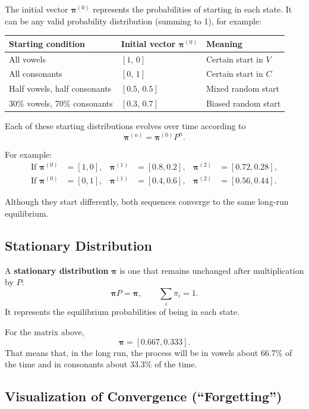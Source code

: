 The initial vector $\boldsymbol{\pi}^{(0)}$ represents the probabilities of starting in each state.  
It can be any valid probability distribution (summing to 1), for example:

\begin{center}
\begin{tabular}{@{}lll@{}}
\toprule
\textbf{Starting condition} & \textbf{Initial vector $\boldsymbol{\pi}^{(0)}$} & \textbf{Meaning} \\ \midrule
All vowels & $[1,\, 0]$ & Certain start in $V$ \\
All consonants & $[0,\, 1]$ & Certain start in $C$ \\
Half vowels, half consonants & $[0.5,\, 0.5]$ & Mixed random start \\
30\% vowels, 70\% consonants & $[0.3,\, 0.7]$ & Biased random start \\
\bottomrule
\end{tabular}
\end{center}

Each of these starting distributions evolves over time according to
\[
\boldsymbol{\pi}^{(n)} = \boldsymbol{\pi}^{(0)} P^n.
\]

For example:
\[
\begin{aligned}
\text{If } \boldsymbol{\pi}^{(0)} &= [1, 0], & \boldsymbol{\pi}^{(1)} &= [0.8, 0.2], & \boldsymbol{\pi}^{(2)} &= [0.72, 0.28], \\
\text{If } \boldsymbol{\pi}^{(0)} &= [0, 1], & \boldsymbol{\pi}^{(1)} &= [0.4, 0.6], & \boldsymbol{\pi}^{(2)} &= [0.56, 0.44].
\end{aligned}
\]

Although they start differently, both sequences converge to the same long-run equilibrium.

\subsection*{Stationary Distribution}

A \textbf{stationary distribution} $\boldsymbol{\pi}$ is one that remains unchanged after multiplication by $P$:
\[
\boldsymbol{\pi} P = \boldsymbol{\pi}, \qquad \sum_i \pi_i = 1.
\]
It represents the equilibrium probabilities of being in each state.

For the matrix above,
\[
\boldsymbol{\pi} = [0.667, 0.333].
\]
That means that, in the long run, the process will be in vowels about 66.7\% of the time and in consonants about 33.3\% of the time.

\subsection*{Visualization of Convergence (``Forgetting'')}

